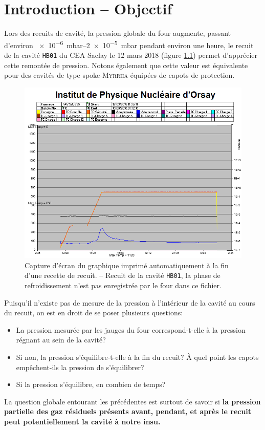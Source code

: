 \chapter{Introduction -- Objectif}
Lors des recuits de cavité, la pression globale du four augmente, passant d'environ \SIrange[range-units = single]{e-6}{2e-5}{\milli\bar} pendant environ une heure, le recuit de la cavité \texttt{HB01} du CEA Saclay le 12 mars 2018 (figure \ref{fig:recuitHB01_plotFour}) permet d'apprécier cette remontée de pression. Notons également que cette valeur est équivalente pour des cavités de type spoke-\textsc{Myrrha} équipées de capots de protection.
\begin{figure}
    \centering
    \includegraphics[width = \textwidth]{Figures/recuitHB01_plotFour.PNG}
    \caption[Cycle thermique du recuit de la cavité \texttt{HB01}.]{Capture d'écran du graphique imprimé automatiquement à la fin d'une recette de recuit. -- Recuit de la cavité \texttt{HB01}, la phase de refroidissement n'est pas enregistrée par le four dans ce fichier.}
    \label{fig:recuitHB01_plotFour}
\end{figure}
Puisqu'il n'existe pas de mesure de la pression à l'intérieur de la cavité au cours du recuit, on est en droit de se poser plusieurs questions:
\begin{itemize}
    \item La pression mesurée par les jauges du four correspond-t-elle à la pression régnant au sein de la cavité?
    \item Si non, la pression s'équilibre-t-elle à la fin du recuit? À quel point les capots empêchent-ils la pression de s'équilibrer?
    \item Si la pression s'équilibre, en combien de temps?
\end{itemize}
La question globale entourant les précédentes est surtout de savoir si \textbf{la pression partielle des gaz résiduels présents avant, pendant, et après le recuit peut potentiellement  la cavité à notre insu.}

